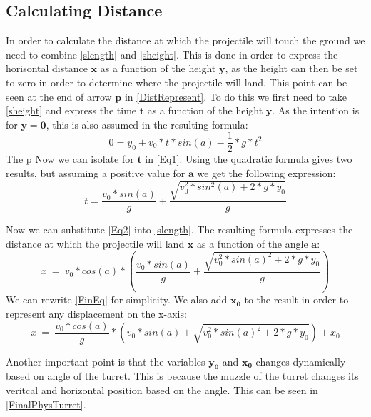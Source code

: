 \subsection{Calculating Distance}\label{CalcDist}
In order to calculate the distance at which the projectile will touch the ground
we need to combine \autoref{slength} and \autoref{sheight}. This is done in
order to express the horisontal distance $\mathbf{x}$ as a function of the
height $\mathbf{y}$, as the height can then be set to zero in order to determine
where the projectile will land. This point can be seen at the end of
arrow $\mathbf{p}$ in \autoref{DistRepresent}. To do this we first need to take
\autoref{sheight} and express the time $\mathbf{t}$ as a function of the height
$\mathbf{y}$. As the intention is for $\mathbf{y=0}$, this is also assumed in
the resulting formula:
\begin{equation}\label{Eq1}
0=y_0+v_0*t*sin(a)-\frac{1}{2}*g*t^2
\end{equation}
The p
Now we can isolate for $\mathbf{t}$ in \autoref{Eq1}. Using the quadratic
formula gives two results, but assuming a positive value for $\mathbf{a}$ we get
the following expression:
\begin{equation}\label{Eq2}
t=\frac{v_0*sin(a)}{g}+\frac{\sqrt{v_0^2*sin^2(a)+2*g*y_0}}{g}
\end{equation}

Now we can substitute \autoref{Eq2} into \autoref{slength}. The resulting
formula expresses the distance at which the projectile will land $\mathbf{x}$ as
a function of the angle $\mathbf{a}$:
\begin{equation}\label{FinEq}
x\ =\ v_0*cos(a)* \left(\frac{v_0*sin(a)}{g} + \frac{
\sqrt{v_0^2*sin(a)^2+2*g*y_0}}{g}\right)
\end{equation}
We can rewrite \autoref{FinEq} for simplicity. We also add $\mathbf{x_0}$ to
the result in order to represent any displacement on the x-axis:
\begin{equation}\label{FinEq2}
x\ =\ \frac{v_0*cos(a)}{g}* \left(
v_0*sin(a)+\sqrt{v_0^2*sin(a)^2+2*g*y_0}\right)+x_0
\end{equation}

Another important point is that the variables $\mathbf{y_0}$ and $\mathbf{x_0}$
changes dynamically based on angle of the turret. This is because the muzzle of
the turret changes its veritcal and horizontal position based on the angle. This
can be seen in \autoref{FinalPhysTurret}.

